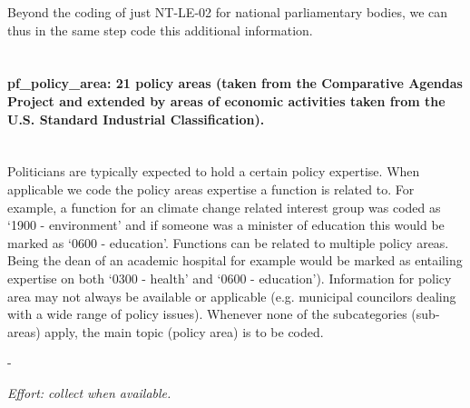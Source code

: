 \documentclass{article}
\begin{document}
Beyond the coding of just NT-LE-02 for national parliamentary bodies, we can thus in the same step code this additional information.
\\
\\
\paragraph{pf\_policy\_area: 21 policy areas (taken from the Comparative Agendas Project and extended by areas of economic activities taken from the U.S. Standard Industrial  Classification).}\label{level4} \\

Politicians are typically expected to hold a certain policy expertise. When applicable we code the policy areas expertise a function is related to.  For example, a function for an climate change related interest group was coded as `1900 - environment' and if someone was a minister of education this would be marked as `0600 - education'. Functions can be related to multiple policy areas. Being the dean of an academic hospital for example would be marked as entailing expertise on both `0300 - health' and `0600 - education'). Information for policy area may not always be available or applicable (e.g. municipal councilors dealing with a wide range of policy issues). Whenever none of the subcategories (sub-areas) apply, the main topic (policy area) is to be coded.
             \par -
             \par\textit{Effort: collect when available.}
\end{document}
